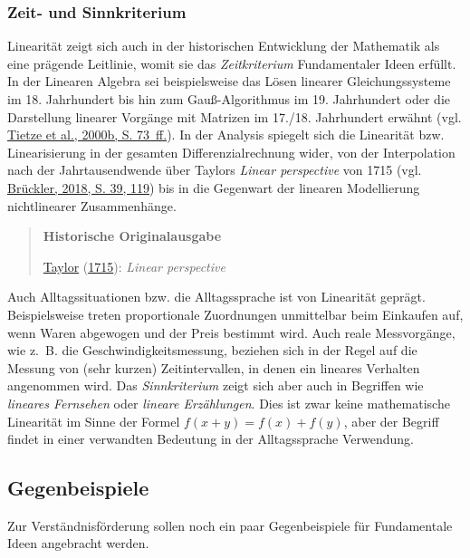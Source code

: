 \documentclass[
  ngerman,
]{scrbook}
\theoremstyle{definition}
\theoremstyle{definition}
\theoremstyle{definition}
\theoremstyle{definition}
\theoremstyle{remark}
\begin{document}
\hypertarget{zeit--und-sinnkriterium}{%
\subsubsection{Zeit- und Sinnkriterium}\label{zeit--und-sinnkriterium}}

Linearität zeigt sich auch in der historischen Entwicklung der Mathematik als eine prägende Leitlinie, womit sie das \emph{Zeitkriterium} Fundamentaler Ideen erfüllt. In der Linearen Algebra sei beispielsweise das Lösen linearer Gleichungssysteme im 18. Jahrhundert bis hin zum Gauß-Algorithmus im 19. Jahrhundert oder die Darstellung linearer Vorgänge mit Matrizen im 17./18. Jahrhundert erwähnt (vgl. \protect\hyperlink{ref-Tietze:2000}{Tietze et al., 2000b, S. 73~ff.}). In der Analysis spiegelt sich die Linearität bzw. Linearisierung in der gesamten Differenzialrechnung wider, von der Interpolation nach der Jahrtausendwende über Taylors \emph{Linear perspective} von 1715 (vgl. \protect\hyperlink{ref-Bruckler:2018}{Brückler, 2018, S. 39, 119}) bis in die Gegenwart der linearen Modellierung nichtlinearer Zusammenhänge.

\begin{quote}
\textbf{Historische Originalausgabe}

\protect\hyperlink{ref-Taylor:1715}{Taylor} (\protect\hyperlink{ref-Taylor:1715}{1715}): \emph{Linear perspective}
\end{quote}

Auch Alltagssituationen bzw. die Alltagssprache ist von Linearität geprägt. Beispielsweise treten proportionale Zuordnungen unmittelbar beim Einkaufen auf, wenn Waren abgewogen und der Preis bestimmt wird. Auch reale Messvorgänge, wie z.~B. die Geschwindigkeitsmessung, beziehen sich in der Regel auf die Messung von (sehr kurzen) Zeitintervallen, in denen ein lineares Verhalten angenommen wird. Das \emph{Sinnkriterium} zeigt sich aber auch in Begriffen wie \emph{lineares Fernsehen} oder \emph{lineare Erzählungen}. Dies ist zwar keine mathematische Linearität im Sinne der Formel \(f(x+y) = f(x) +f(y)\), aber der Begriff findet in einer verwandten Bedeutung in der Alltagssprache Verwendung.

\hypertarget{gegenbeispiele}{%
\subsection{Gegenbeispiele}\label{gegenbeispiele}}

Zur Verständnisförderung sollen noch ein paar Gegenbeispiele für Fundamentale Ideen angebracht werden.
\end{document}
